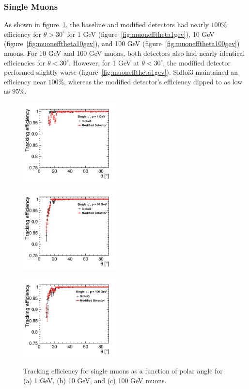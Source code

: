 \subsubsection{Single Muons}
As shown in figure~\ref{fig:muonefftheta}, 
the baseline and modified detectors had nearly $100\%$ efficiency
for $\theta>30^{\circ}$ for 1 GeV (figure~\ref{fig:muonefftheta1gev}),
10 GeV (figure~\ref{fig:muonefftheta10gev}), and 100 GeV (figure~\ref{fig:muonefftheta100gev}) muons.
For 10 GeV and 100 GeV muons, both detectors also had nearly identical
efficiencies for $\theta < 30^{\circ}$.
However, for 1 GeV at $\theta<30^{\circ}$, the modified detector performed slightly worse (figure~\ref{fig:muonefftheta1gev}).
Sidloi3 maintained an efficiency near $100\%$, whereas the modified detector's efficiency dipped to as low as $95\%$.
\begin{figure}[h!]
\begin{minipage}{.33\textwidth}
\centering
\includegraphics[width=2.0in]{muonEfficiencyThetaComparison1GeV.png}
\label{fig:muonefftheta1gev}
\end{minipage}%
\begin{minipage}{.33\textwidth}
\centering
\includegraphics[width=2.0in]{muonEfficiencyThetaComparison10GeV.png}
\label{fig:muonefftheta10gev}
\end{minipage}
\begin{minipage}{.33\textwidth}
\centering
\includegraphics[width=2.0in]{muonEfficiencyThetaComparison100GeV.png}
\label{fig:muonefftheta100gev}
\end{minipage}
\caption{Tracking efficiency for single muons as a function of polar angle
for (a) 1 GeV, (b) 10 GeV, and (c) 100 GeV muons.}
\label{fig:muonefftheta}
\end{figure}

